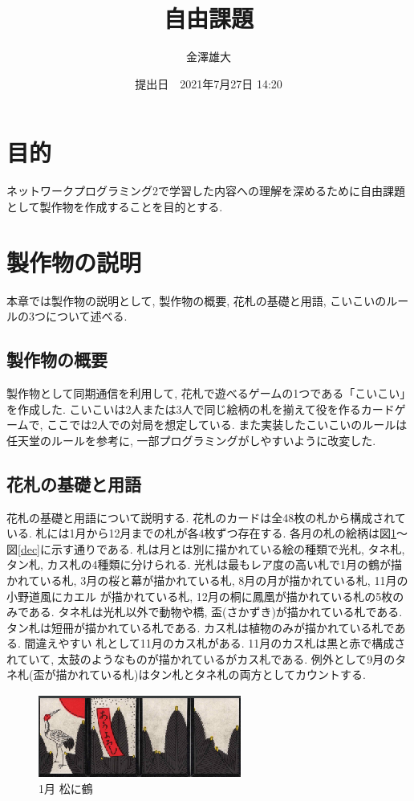 \documentclass[a4j]{jarticle}
\title{自由課題}
\date{提出日　2021年7月27日 14:20}
\author{金澤雄大}
\begin{document}
    \maketitle
    \thispagestyle{empty}
    \clearpage
    \addtocounter{page}{-1}
    \section{目的}
    ネットワークプログラミング2で学習した内容への理解を深めるために自由課題として製作物を作成することを目的とする.

    \section{製作物の説明}
    本章では製作物の説明として, 製作物の概要, 花札の基礎と用語, こいこいのルールの3つについて述べる.
    \subsection{製作物の概要}
    製作物として同期通信を利用して, 花札で遊べるゲームの1つである「こいこい」を作成した. こいこいは2人または3人で同じ絵柄の札を揃えて役を作るカードゲームで, ここでは2人での対局を想定している.
    また実装したこいこいのルールは任天堂のルール\cite{nintendo}を参考に, 一部プログラミングがしやすいように改変した.

    \subsection{花札の基礎と用語}
    花札の基礎と用語について説明する. 花札のカードは全48枚の札から構成されている. 札には1月から12月までの札が各4枚ずつ存在する. 各月の札の絵柄は図\ref{jan}～図\ref{dec}に示す通りである.
    札は月とは別に描かれている絵の種類で光札, タネ札, タン札, カス札の4種類に分けられる. 光札は最もレア度の高い札で1月の鶴が描かれている札, 3月の桜と幕が描かれている札, 8月の月が描かれている札, 11月の小野道風にカエル
    が描かれている札, 12月の桐に鳳凰が描かれている札の5枚のみである. タネ札は光札以外で動物や橋, 盃(さかずき)が描かれている札である. タン札は短冊が描かれている札である. カス札は植物のみが描かれている札である. 間違えやすい
    札として11月のカス札がある. 11月のカス札は黒と赤で構成されていて, 太鼓のようなものが描かれているがカス札である. 例外として9月のタネ札(盃が描かれている札)はタン札とタネ札の両方としてカウントする.
    
    \begin{figure}[H]
    \centering
    \includegraphics[scale=1.5]{./img/jan.eps}
    \caption{1月 松に鶴}
    \label{jan}
    \end{figure}
\end{document}
